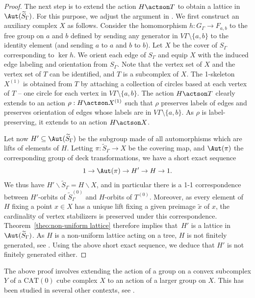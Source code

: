 \begin{proof}
The next step is to extend the action $H\actson T$ to obtain a lattice in $\Aut(\widetilde S_\Gamma)$. For this purpose, we adjust the argument in \cite[Th.\,9.5]{Hua2}. We first construct an auxiliary complex $X$ as follows. Consider the homomorphism $h:G_\Gamma\to F_{a,b}$ to the free group on $a$ and $b$ defined by sending any generator in $V\Gamma\setminus\{a,b\}$ to the identity element (and sending $a$ to $a$ and $b$ to $b$). Let $X$ be the cover of $S_\Gamma$ corresponding to $\ker h$. We orient each edge of $S_\Gamma$ and equip $X$ with the induced edge labeling and orientation from $S_\Gamma$. Note that the vertex set of $X$ and the vertex set of $T$ can be identified, and $T$ is a subcomplex of $X$. The 1-skeleton $X^{(1)}$ is obtained from $T$ by attaching a collection of circles based at each vertex of $T$ -- one circle for each vertex in $V\Gamma\setminus\{a,b\}$. The action $H\actson T$ clearly extends to an action $\rho:H\actson X^{(1)}$ such that $\rho$ preserves labels of edges and preserves orientation of edges whose labels are in $V\Gamma\setminus\{a,b\}$. As $\rho$ is label-preserving, it extends to an action $H\actson X$.

Let now $H'\subseteq \Aut(\widetilde{S}_\Gamma)$ be the subgroup made of all automorphisms which are lifts of elements of $H$. Letting $\pi:\widetilde{S}_\Gamma\to X$ be the covering map, and $\Aut(\pi)$ the corresponding group of deck transformations, we have a short exact sequence
\[
1\to\Aut(\pi)\to H'\to H\to 1.
\]
We thus have $H'\backslash\widetilde S_\Gamma=H\backslash X$, and in particular there is a 1-1 correspondence between $H'$-orbits of $\widetilde S^{(0)}_\Gamma$ and $H$-orbits of $T^{(0)}$. Moreover, as every element of $H$ fixing a point $x\in X$ has a unique lift fixing a given preimage $\widetilde{x}$ of $x$, the cardinality of vertex stabilizers is preserved under this correspondence. Theorem~\ref{theo:non-uniform lattice} therefore implies that~$H'$ is a lattice in $\Aut(\widetilde S_\Gamma)$. As $H$ is a non-uniform lattice acting on a tree, $H$ is not finitely generated, see \cite[Cor.\,5.16]{bass2001tree}. Using the above short exact sequence, we deduce that $H'$ is not finitely generated either.
\end{proof}

\begin{rk}
The above proof involves extending the action of a group on a convex subcomplex $Y$ of a $\mathrm{CAT}(0)$ cube complex $X$ to an action of a larger group on $X$. This has been studied in several other contexts, see \eg \cite{haglund2008finite,haglund2008special}.
\end{rk}

